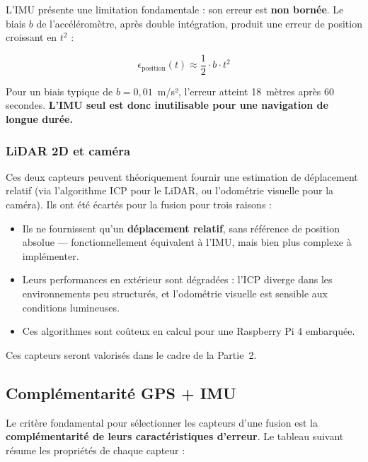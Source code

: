 L'IMU présente une limitation fondamentale : son erreur est \textbf{non
bornée}. Le biais $b$ de l'accéléromètre, après double intégration, produit
une erreur de position croissant en $t^2$ :

\begin{equation}
    \epsilon_{\text{position}}(t) \approx \frac{1}{2} \cdot b \cdot t^2
\end{equation}

Pour un biais typique de $b = 0{,}01$~m/s², l'erreur atteint 18~mètres après
60 secondes. \textbf{L'IMU seul est donc inutilisable pour une navigation de
longue durée.}

\subsubsection{LiDAR 2D et caméra}

Ces deux capteurs peuvent théoriquement fournir une estimation de déplacement
relatif (via l'algorithme ICP pour le LiDAR, ou l'odométrie visuelle pour la
caméra). Ils ont été écartés pour la fusion pour trois raisons :

\begin{itemize}
    \item Ils ne fournissent qu'un \textbf{déplacement relatif}, sans
    référence de position absolue — fonctionnellement équivalent à l'IMU,
    mais bien plus complexe à implémenter.
    \item Leurs performances en extérieur sont dégradées : l'ICP diverge dans
    les environnements peu structurés, et l'odométrie visuelle est sensible
     aux conditions lumineuses.
    \item Ces algorithmes sont coûteux en calcul pour une Raspberry Pi 4
    embarquée.
\end{itemize}

Ces capteurs seront valorisés dans le cadre de la Partie~2.

\subsection{Complémentarité GPS + IMU}

Le critère fondamental pour sélectionner les capteurs d'une fusion est la
\textbf{complémentarité de leurs caractéristiques d'erreur}. Le tableau
suivant résume les propriétés de chaque capteur :

